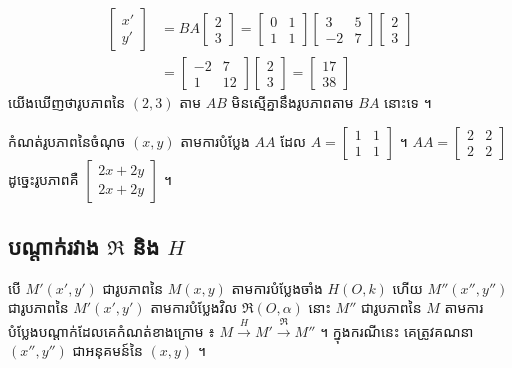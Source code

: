 \[
\begin{aligned}
\begin{bmatrix} x'\\ y' \end{bmatrix} &= BA\begin{bmatrix} 2\\ 3 \end{bmatrix} = \begin{bmatrix} 0 & 1\\ 1 & 1 \end{bmatrix}\begin{bmatrix} 3 & 5\\ -2 & 7 \end{bmatrix}\begin{bmatrix} 2\\ 3 \end{bmatrix}\\
&= \begin{bmatrix} -2 & 7\\ 1 & 12 \end{bmatrix}\begin{bmatrix} 2\\ 3 \end{bmatrix} = \begin{bmatrix} 17\\ 38 \end{bmatrix}
\end{aligned}
\]
យើងឃើញថារូបភាពនៃ $(2, 3)$ តាម $AB$ មិនស្មើគ្នានឹងរូបភាពតាម $BA$ នោះទេ ។

\begin{pro}
កំណត់រូបភាពនៃចំណុច $(x, y)$ តាមការបំប្លែង $AA$ ដែល $A = \begin{bmatrix} 1 & 1\\ 1 & 1 \end{bmatrix}$ ។
\ans
$AA = \begin{bmatrix} 2 & 2\\ 2 & 2 \end{bmatrix}$ ដូច្នេះរូបភាពគឺ $\begin{bmatrix} 2x + 2y\\ 2x + 2y \end{bmatrix}$ ។
\end{pro}

\subsection{បណ្ដាក់រវាង \texorpdfstring{$\mathfrak{R}$}{R} និង \texorpdfstring{$H$}{H}}

បើ $M'(x', y')$ ជារូបភាពនៃ $M(x, y)$ តាមការបំប្លែងចាំង $H(O, k)$ ហើយ $M''(x'', y'')$ ជារូបភាពនៃ $M'(x', y')$ តាមការបំប្លែងវិល $\mathfrak{R}(O, \alpha)$ នោះ $M''$ ជារូបភាពនៃ $M$ តាមការបំប្លែងបណ្ដាក់ដែលគេកំណត់ខាងក្រោម ៖ $M \xrightarrow{H} M' \xrightarrow{\mathfrak{R}} M''$ ។ ក្នុងករណីនេះ គេត្រូវគណនា $(x'', y'')$ ជាអនុគមន៍នៃ $(x, y)$ ។

